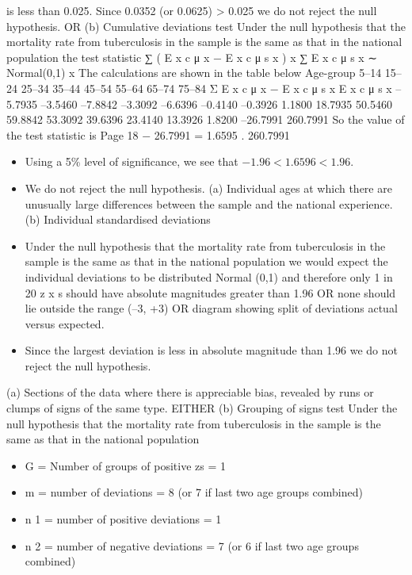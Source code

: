 \documentclass[a4paper,12pt]{article}
\begin{document}
\begin{enumerate}
is less than 0.025.
Since 0.0352 (or 0.0625) > 0.025
we do not reject the null hypothesis.
OR
(b)
Cumulative deviations test
Under the null hypothesis that the mortality rate from tuberculosis in the sample is the same as that in the national population
the test statistic
∑ ( E x c μ x − E x c μ s x )
x
∑ E x c μ s x
∼ Normal(0,1)
x
The calculations are shown in the table below
Age-group
5–14
15–24
25–34
35–44
45–54
55–64
65–74
75–84
Σ
E x c μ x − E x c μ s x E x c μ s x
–5.7935
–3.5460
–7.8842
–3.3092
–6.6396
–0.4140
–0.3926
1.1800 18.7935
50.5460
59.8842
53.3092
39.6396
23.4140
13.3926
1.8200
–26.7991 260.7991
So the value of the test statistic is
Page 18
− 26.7991
= 1.6595 .
260.7991

\begin{itemize}
\item Using a 5\% level of significance, we see that $−1.96 < 1.6596 < 1.96$.
\item We do not reject the null hypothesis.
(a) Individual ages at which there are unusually large differences between the sample and the national experience.
(b) Individual standardised deviations
\item Under the null hypothesis that the mortality rate from tuberculosis in the sample is the same as that in the national population
we would expect the individual deviations to be distributed Normal (0,1) and therefore only 1 in 20 z x s should have absolute magnitudes greater than
1.96
OR
none should lie outside the range (–3, +3)
OR
diagram showing split of deviations actual versus expected.
\item Since the largest deviation is less in absolute magnitude than 1.96 we do not reject the null hypothesis.
\end{itemize}
(a)
Sections of the data where there is appreciable bias, revealed by runs or clumps of signs of the same type.
EITHER
(b)
Grouping of signs test
Under the null hypothesis that the mortality rate from tuberculosis in the
sample is the same as that in the national population
\begin{itemize}
\item G = Number of groups of positive zs = 1
\item m = number of deviations = 8 (or 7 if last two age groups combined)
\item n 1 = number of positive deviations = 1
\item n 2 = number of negative deviations = 7 (or 6 if last two age groups combined)
\end{itemize}


\end{enumerate}
\end{document}
